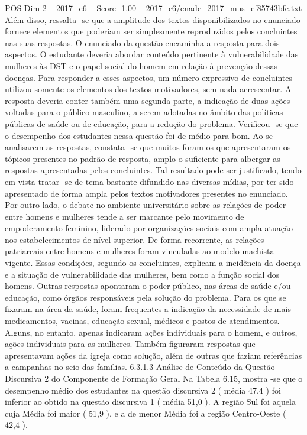 \begin{textsample}{POS Dim 2 – 2017\_c6 – Score -1.00 – 2017\_c6/enade\_2017\_mus\_ef85743bfe.txt}
Além disso, ressalta -se que a amplitude dos textos disponibilizados no enunciado fornece elementos que poderiam ser simplesmente reproduzidos pelos concluintes nas suas respostas.
O enunciado da questão encaminha a resposta para dois aspectos.
O estudante deveria abordar conteúdo pertinente à vulnerabilidade das mulheres às DST e o papel social do homem em relação à prevenção dessas doenças.
Para responder a esses aspectos, um número expressivo de concluintes utilizou somente os elementos dos textos motivadores, sem nada acrescentar.
A resposta deveria conter também uma segunda parte, a indicação de duas ações voltadas para o público masculino, a serem adotadas no âmbito das políticas públicas de saúde ou de educação, para a redução do problema.
Verificou -se que o desempenho dos estudantes nessa questão foi de médio para bom.
Ao se analisarem as respostas, constata -se que muitos foram os que apresentaram os tópicos presentes no padrão de resposta, amplo o suficiente para albergar as respostas apresentadas pelos concluintes.
Tal resultado pode ser justificado, tendo em vista tratar -se de tema bastante difundido nas diversas mídias, por ter sido apresentado de forma ampla pelos textos motivadores presentes no enunciado.
Por outro lado, o debate no ambiente universitário sobre as relações de poder entre homens e mulheres tende a ser marcante pelo movimento de empoderamento feminino, liderado por organizações sociais com ampla atuação nos estabelecimentos de nível superior.
De forma recorrente, as relações patriarcais entre homens e mulheres foram vinculadas ao modelo machista vigente.
Essas condições, segundo os concluintes, explicam a incidência da doença e a situação de vulnerabilidade das mulheres, bem como a função social dos homens.
Outras respostas apontaram o poder público, nas áreas de saúde e/ou educação, como órgãos responsáveis pela solução do problema.
Para os que se fixaram na área da saúde, foram frequentes a indicação da necessidade de mais medicamentos, vacinas, educação sexual, médicos e postos de atendimentos.
Alguns, no entanto, apenas indicaram ações individuais para o homem, e outros, ações individuais para as mulheres.
Também figuraram respostas que apresentavam ações da igreja como solução, além de outras que faziam referências a campanhas no seio das famílias. 6.3.1.3 Análise de Conteúdo da Questão Discursiva 2 do Componente de Formação Geral Na Tabela 6.15, mostra -se que o desempenho médio dos estudantes na questão discursiva 2 ( média 47,4 ) foi inferior ao obtido na questão discursiva 1 ( média 51,0 ).
A região Sul foi aquela cuja Média foi maior ( 51,9 ), e a de menor Média foi a região Centro-Oeste ( 42,4 ).

\end{textsample}
